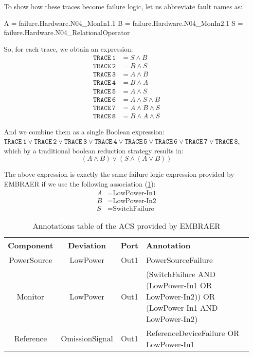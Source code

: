\documentclass[en,twoside,onehalfspacing,phd]{risethesis}
\newcommand{\EMBRAER}{EMBRAER\xspace}
\newenvironment{snippetcspm}[1][2]
{
\ifthenelse{\equal{#1}{0}}
    {\tiny}
    {
    \ifthenelse{\equal{#1}{1}}
        {\scriptsize}
        {
        \ifthenelse{\equal{#1}{2}}
            {\footnotesize}
            {\small}
        }
    }
\verbatim
}
{
\endverbatim
}
\begin{document}
To show how these traces become failure logic, let us abbreviate fault names as:
%
\begin{snippetcspm}[2]
A = failure.Hardware.N04_MonIn1.1
B = failure.Hardware.N04_MonIn2.1
S = failure.Hardware.N04_RelationalOperator
\end{snippetcspm}
%
So, for each trace, we obtain an expression:
\begin{align*}
\mathtt{TRACE\,1} &= S \land B\\
\mathtt{TRACE\,2} &= B \land S\\
\mathtt{TRACE\,3} &= A \land B\\
\mathtt{TRACE\,4} &= B \land A\\
\mathtt{TRACE\,5} &= A \land S\\
\mathtt{TRACE\,6} &= A \land S \land B\\
\mathtt{TRACE\,7} &= A \land B \land S\\
\mathtt{TRACE\,8} &= B \land A \land S
\end{align*}

And we combine them as a single Boolean expression:
%
$\mathtt{TRACE\,1} \lor \mathtt{TRACE\,2} \lor \mathtt{TRACE\,3} \lor \mathtt{TRACE\,4} \lor \mathtt{TRACE\,5} \lor \mathtt{TRACE\,6} \lor \mathtt{TRACE\,7} \lor \mathtt{TRACE\,8}$, %
which by a traditional boolean reduction strategy results in:
%
\[(A \land B) \lor (S \land (A \lor B))\]

\begin{sloppypar}
The above expression is exactly the same failure logic expression provided by \EMBRAER if we use the following association (\cref{tbl:acsAnnotations}):
\begin{align*}
A &= \text{LowPower-In1}\\
B &= \text{LowPower-In2}\\
S &= \text{SwitchFailure}
\end{align*}
\end{sloppypar}

\begin{table}[t]
\renewcommand{\arraystretch}{1.3}
\caption{Annotations table of the ACS provided by \EMBRAER}
\label{tbl:acsAnnotations}
\centering
\begin{tabularx}{\linewidth}{|c|c|c|X|}
\hline
\bfseries Component & \bfseries Deviation & \bfseries Port & \bfseries Annotation \\
\hline
PowerSource & LowPower & Out1 & PowerSourceFailure\\
\hline
Monitor & LowPower & Out1 & (SwitchFailure AND (LowPower-In1 OR LowPower-In2)) OR (LowPower-In1 AND LowPower-In2) \\
\hline
Reference & OmissionSignal & Out1 & ReferenceDeviceFailure OR LowPower-In1\\
\hline
\end{tabularx}
\end{table}
\end{document}
